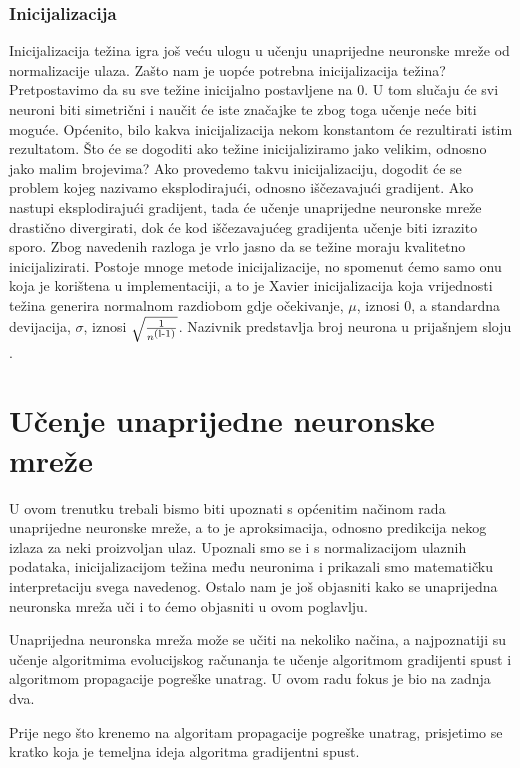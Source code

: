 \documentclass[times, utf8, zavrsni]{fer}
\begin{document}
\subsubsection{Inicijalizacija}
Inicijalizacija  težina igra još veću ulogu u učenju unaprijedne neuronske mreže od normalizacije ulaza. Zašto nam je uopće potrebna inicijalizacija težina? Pretpostavimo da su sve težine inicijalno postavljene na 0. U tom slučaju će svi neuroni biti simetrični i naučit će iste značajke te zbog toga učenje neće biti moguće. Općenito, bilo kakva inicijalizacija nekom konstantom će rezultirati istim rezultatom. Što će se dogoditi ako težine inicijaliziramo jako velikim, odnosno jako malim brojevima? Ako provedemo takvu inicijalizaciju, dogodit će se problem kojeg nazivamo eksplodirajući, odnosno iščezavajući gradijent. Ako nastupi eksplodirajući gradijent, tada će učenje unaprijedne neuronske mreže drastično divergirati, dok će kod iščezavajućeg gradijenta učenje biti izrazito sporo. Zbog navedenih razloga je vrlo jasno da se težine moraju kvalitetno inicijalizirati. Postoje mnoge metode inicijalizacije, no spomenut ćemo samo onu koja je korištena u implementaciji, a to je Xavier inicijalizacija koja vrijednosti težina generira normalnom razdiobom gdje očekivanje, $\mu$, iznosi 0, a standardna devijacija, $\sigma$, iznosi $\sqrt{\frac{1}{n\textsuperscript{(l-1)}}}$. Nazivnik predstavlja broj neurona u prijašnjem sloju \citep{init}.

\section{Učenje unaprijedne neuronske mreže}
U ovom trenutku trebali bismo biti upoznati s općenitim načinom rada unaprijedne neuronske mreže, a to je aproksimacija, odnosno predikcija nekog izlaza za neki proizvoljan ulaz. Upoznali smo se i s normalizacijom ulaznih podataka, inicijalizacijom težina među neuronima i prikazali smo matematičku interpretaciju svega navedenog. Ostalo nam je još objasniti kako se unaprijedna neuronska mreža uči i to ćemo objasniti u ovom poglavlju.

Unaprijedna neuronska mreža može se učiti na nekoliko načina, a najpoznatiji su učenje algoritmima evolucijskog računanja te učenje algoritmom gradijenti spust i algoritmom propagacije pogreške unatrag. U ovom radu fokus je bio na zadnja dva.

\bigskip

Prije nego što krenemo na algoritam propagacije pogreške unatrag, prisjetimo se kratko koja je temeljna ideja algoritma gradijentni spust.
\end{document}
